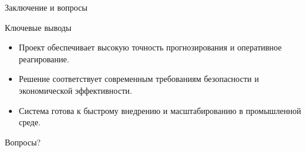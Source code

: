 \documentclass[aspectratio=169]{beamer}
\begin{document}
\begin{frame}{Заключение и вопросы}
  \begin{block}{Ключевые выводы}
    \begin{itemize}
      \item Проект обеспечивает высокую точность прогнозирования и оперативное реагирование.
      \item Решение соответствует современным требованиям безопасности и экономической эффективности.
      \item Система готова к быстрому внедрению и масштабированию в промышленной среде.
    \end{itemize}
  \end{block}
  \centering
  \Large Вопросы?
\end{frame}
\end{document}
